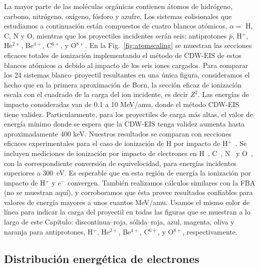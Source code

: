 La mayor parte de las moléculas orgánicas contienen átomos de hidrógeno, 
carbono, nitrógeno, oxígeno, fósforo y azufre. Los sistemas colisionales
que estudiamos a continuación están compuestos de cuatro blancos 
atómicos, $\alpha=$ H, C, N y O, mientras que los proyectiles incidentes 
serán seis: antiprotones $\bar{p}$, H$^{+}$, He$^{2+}$, Be$^{4+}$, 
C$^{6+}$, y O$^{8+}$. En la Fig.~\ref{fig:atomscaling} se muestran las 
secciones eficaces totales de ionización implementando el método de 
CDW-EIS de estos blancos atómicos $\alpha$ debido al impacto de los seis 
iones cargados. Para comparar los 24 sistemas blanco--proyectil 
resultantes en una única figura, consideramos el hecho que en la primera 
aproximación de Born, la sección eficaz de ionización escala con el 
cuadrado de la carga del ion incidente, es decir $Z^{2}$. 
Las energías de impacto consideradas van de 0.1 a 10 MeV/amu, donde el 
método CDW-EIS tiene validez. Particularmente, para los proyectiles de 
carga más altas, el valor de energía mínimo donde se espera que la 
CDW-EIS tenga validez aumenta hasta aproximadamente 400 keV. Nuestros 
resultados se comparan con secciones eficaces experimentales para el caso 
de ionización de H por impacto de H$^+$~\cite{Shah:81}. Se incluyen 
mediciones de ionización por impacto de electrones en H~\cite{Shah:87}, 
C~\cite{Brook:78}, N~\cite{Brook:78} y O~\cite{Thompson:95}, con la 
correspondiente conversión de equivelocidad, para energías incidentes 
superiores a 300~eV. Es esperable que en esta región de energía la 
ionización por impacto de H$^+$ y $e^-$ convergen. También realizamos 
cálculos similares con la FBA (no se muestran aquí), y corroboramos que 
ésta provee resultados confiables para valores de energía mayores a unos 
cuantos MeV/amu. Usamos el mismo color de línea para indicar la carga del 
proyectil en todas las figuras que se muestran a lo largo de este 
Capítulo: discontinua--roja, sólida--roja, azul, magenta, oliva y naranja 
para antiprotones, H$^{+}$, He$^{2+}$, Be$^{4+}$, C$^{6+}$, y O$^{8+}$, 
respectivamente. 

\subsection{Distribución energética de electrones}
\label{subsec:meanener}

